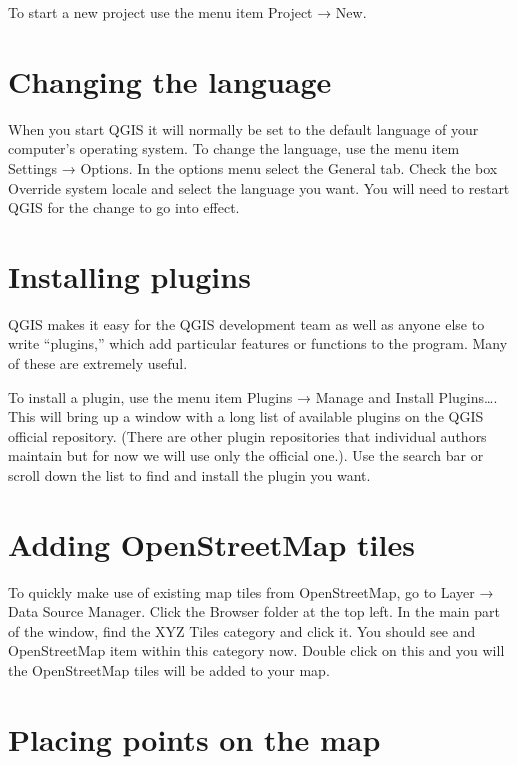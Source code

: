 \documentclass[]{book}
\begin{document}
To start a new project use the menu item Project → New.

\hypertarget{changing-the-language}{%
\section{Changing the language}\label{changing-the-language}}

When you start QGIS it will normally be set to the default language of your computer's operating system. To change the language, use the menu item Settings → Options. In the options menu select the General tab. Check the box Override system locale and select the language you want. You will need to restart QGIS for the change to go into effect.

\hypertarget{installing-plugins}{%
\section{Installing plugins}\label{installing-plugins}}

QGIS makes it easy for the QGIS development team as well as anyone else to write ``plugins,'' which add particular features or functions to the program. Many of these are extremely useful.

To install a plugin, use the menu item Plugins → Manage and Install Plugins\ldots{}. This will bring up a window with a long list of available plugins on the QGIS official repository. (There are other plugin repositories that individual authors maintain but for now we will use only the official one.). Use the search bar or scroll down the list to find and install the plugin you want.

\hypertarget{osm-tiles}{%
\section{Adding OpenStreetMap tiles}\label{osm-tiles}}

To quickly make use of existing map tiles from OpenStreetMap, go to Layer → Data Source Manager. Click the Browser folder at the top left. In the main part of the window, find the XYZ Tiles category and click it. You should see and OpenStreetMap item within this category now. Double click on this and you will the OpenStreetMap tiles will be added to your map.

\hypertarget{placing-points-on-the-map}{%
\section{Placing points on the map}\label{placing-points-on-the-map}}
\end{document}

